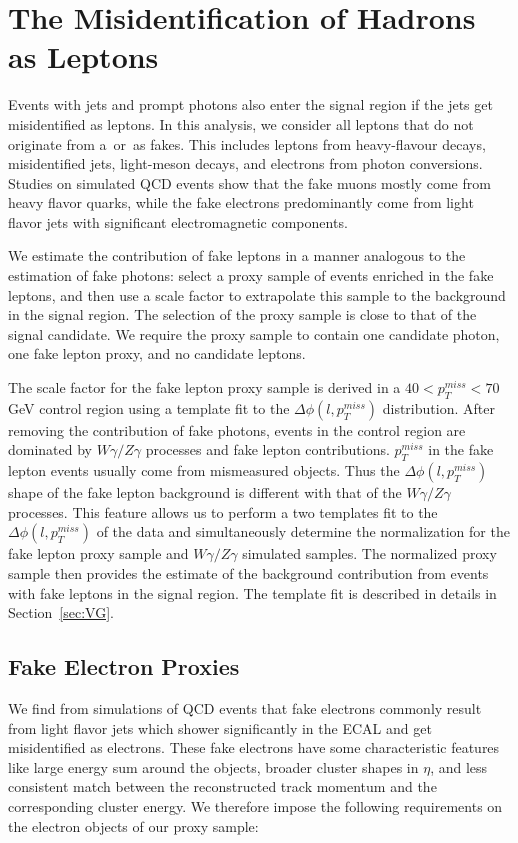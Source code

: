 \documentclass[thesis.tex]{subfiles}
\renewcommand\_{\textunderscore\allowbreak}
\begin{document}
\section{The Misidentification of Hadrons as Leptons}
\label{sec:jetfakelep}

Events with jets and prompt photons also enter the signal region if the jets get misidentified as leptons. In this analysis,  we consider all leptons that do not originate  from a~\PWpm or~\PZz as  fakes. This includes leptons from heavy-flavour decays, misidentified jets, light-meson decays, and electrons from photon conversions. Studies on simulated QCD events show that the fake muons mostly come from  heavy flavor quarks, while the fake electrons predominantly come from light flavor jets with significant electromagnetic components. 

We estimate the contribution of fake leptons in a manner analogous to the
estimation of fake photons: select a proxy sample of events enriched in the fake leptons, and then use a scale factor to extrapolate this sample to the background in the signal region.  The selection of the proxy sample is close to that of the signal candidate. We require the proxy sample to contain one candidate photon, one fake lepton proxy, and no candidate leptons. 

The scale factor for the fake lepton proxy sample is derived in a $40 < p_{T}^{miss} < 70$ GeV control region using a template fit to the
$\Delta\phi\left(l, p_{T}^{miss}\right)$ distribution. After removing the contribution of fake photons, events in the control region are dominated by $W\gamma/Z\gamma$ processes and fake lepton contributions. $p_{T}^{miss}$ in the fake lepton events usually come from mismeasured objects. Thus the $\Delta\phi\left(l, p_{T}^{miss}\right)$ shape of the fake lepton background is different with that of the $W\gamma/Z\gamma$ processes. This feature allows us to perform a two templates fit to the $\Delta\phi\left(l, p_{T}^{miss}\right)$ of the data and simultaneously determine the normalization for the fake lepton proxy sample and $W\gamma/Z\gamma$ simulated samples. The normalized proxy sample then provides the estimate of the
background contribution from events with fake leptons in the signal region. The template fit is described in details in Section~\ref{sec:VG}. 

\subsection{Fake Electron Proxies}
We find from simulations of QCD events that fake electrons commonly result from light flavor jets which shower significantly in the ECAL and get misidentified as electrons. These fake electrons have some characteristic features like large energy sum around the objects,  broader cluster shapes in $\eta$, and less consistent match between the reconstructed track momentum and the corresponding cluster energy. We therefore impose the following requirements on the electron objects of our proxy sample:
\end{document}
